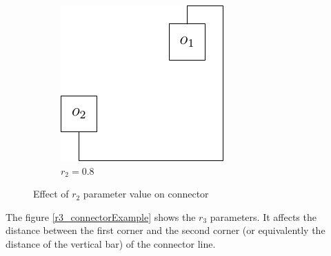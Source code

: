 \documentclass[a4paper,12pt]{report}
\begin{document}
\begin{figure}
\begin{subfigure}{.33\textwidth}
  \end{subfigure}\hfill
  \begin{subfigure}{.33\textwidth}
    \centering
    \includegraphics[width=0.9\linewidth]{connectorExample_r2_0_8.pdf}
    \caption{$r_2=0.8$}
  \end{subfigure}

  \caption{Effect of $r_2$ parameter value on connector}
  \label{r2_connectorExample}
\end{figure}

The figure \ref{r3_connectorExample} shows the $r_3$ parameters. It affects the distance between the first corner and the second corner (or equivalently the distance of the vertical bar) of the connector line.
\end{document}
